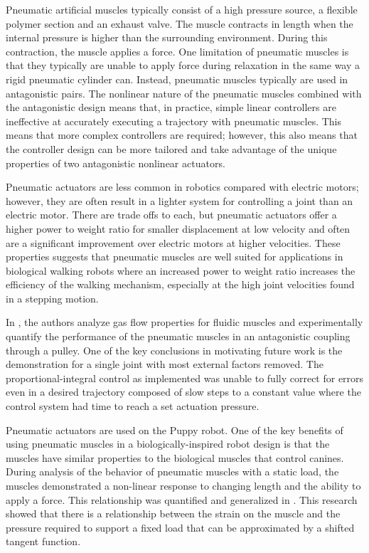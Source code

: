 
Pneumatic artificial muscles typically consist of a high pressure source, a
flexible polymer section and an exhaust valve. The muscle contracts in length
when the internal pressure is higher than the surrounding environment. During
this contraction, the muscle applies a force. One limitation of pneumatic
muscles is that they typically are unable to apply force during relaxation in
the same way a rigid pneumatic cylinder can. Instead, pneumatic muscles typically are used in
antagonistic pairs. The nonlinear nature of the pneumatic muscles combined with the
antagonistic design means that, in practice, simple linear controllers are
ineffective at accurately executing a trajectory with pneumatic muscles. This means that more complex controllers are required; however,
this also means that the controller design can be more tailored and take
advantage of the unique properties of two antagonistic nonlinear actuators.

Pneumatic actuators are less common in robotics compared with electric motors;
however,
they are often result in a lighter system for controlling a joint than an
electric motor. There are trade offs to each, but pneumatic actuators offer a
higher power to weight ratio for smaller displacement at low velocity and
often are a significant improvement over electric motors at higher velocities.
\cite{Tavakoli2008} These properties suggests that pneumatic muscles are well suited for applications in
biological walking robots where an increased power to weight ratio increases
the efficiency of the walking mechanism, especially at the high joint velocities
found in a stepping motion.


In \cite{Situm2008}, the authors analyze gas flow properties for fluidic muscles
and experimentally quantify the performance of the pneumatic muscles in an antagonistic coupling
through a pulley. One of the key conclusions in \cite{Situm2008} motivating future work is the
demonstration for a single joint with most external factors removed. The
proportional-integral control as implemented was unable to fully correct for
errors even in a desired trajectory composed of slow steps to a constant value
where the control system had time to reach a set actuation pressure.

Pneumatic actuators are used on the Puppy robot. One of the key
benefits of using pneumatic muscles in a biologically-inspired robot design is
that the muscles have similar properties to the biological muscles that control
canines. \cite{Tavakoli2008}
During analysis of the behavior of pneumatic muscles with a static load, the muscles demonstrated a non-linear response to
changing length and the ability to apply a force. This relationship was
quantified and generalized in \cite{HuntPMuscles}. This research showed that
there is a relationship between the strain on the muscle and the pressure
required to support a fixed load that can be approximated by a shifted tangent
function. 

